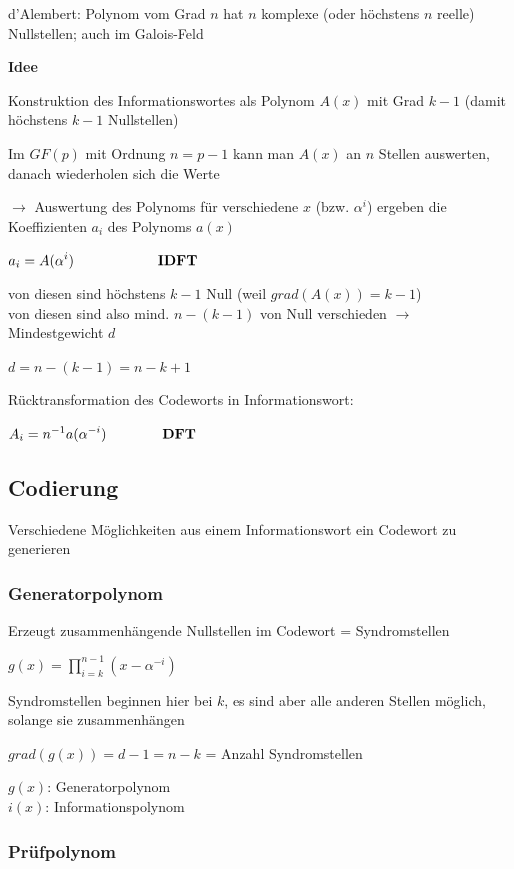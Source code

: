 d'Alembert: Polynom vom Grad $n$ hat $n$ komplexe (oder höchstens $n$ reelle) Nullstellen; auch
im Galois-Feld

\textbf{Idee}

Konstruktion des Informationswortes als Polynom $A(x)$ mit Grad $k-1$ (damit höchstens $k-1$ Nullstellen)

Im $GF(p)$ mit Ordnung $n = p-1$ kann man $A(x)$ an $n$ Stellen auswerten, danach wiederholen sich die Werte

$\rightarrow$ Auswertung des Polynoms für verschiedene $x$ (bzw. $\alpha^i$) ergeben die Koeffizienten $a_i$ des
Polynoms $a(x)$

$\displaystyle{
    a_i = A(\alpha^i) \qquad\qquad\qquad \text{\textbf{IDFT}}
}$

von diesen sind höchstens $k-1$ Null (weil $grad(A(x)) = k-1$)\\
von diesen sind also mind. $n - (k-1)$ von Null verschieden $\rightarrow$ Mindestgewicht $d$

$d = n - (k - 1) = n - k + 1$

Rücktransformation des Codeworts in Informationswort:

$\displaystyle{
    A_i = n^{-1} a(\alpha^{-i}) \qquad\qquad \text{\textbf{DFT}}
}$

\subsection{Codierung}

Verschiedene Möglichkeiten aus einem Informationswort ein Codewort zu generieren

\subsubsection{Generatorpolynom}
\label{subsubsec:gen-poly}

Erzeugt zusammenhängende Nullstellen im Codewort = Syndromstellen

$\displaystyle{
    g(x) = \prod_{i=k}^{n-1} \left(x - \alpha^{-i}\right)
}$

Syndromstellen beginnen hier bei $k$, es sind aber alle anderen Stellen möglich, solange sie zusammenhängen

$grad(g(x)) = d-1 = n-k$ = Anzahl Syndromstellen

$g(x)$: Generatorpolynom\\
$i(x)$: Informationspolynom

\subsubsection{Prüfpolynom}

